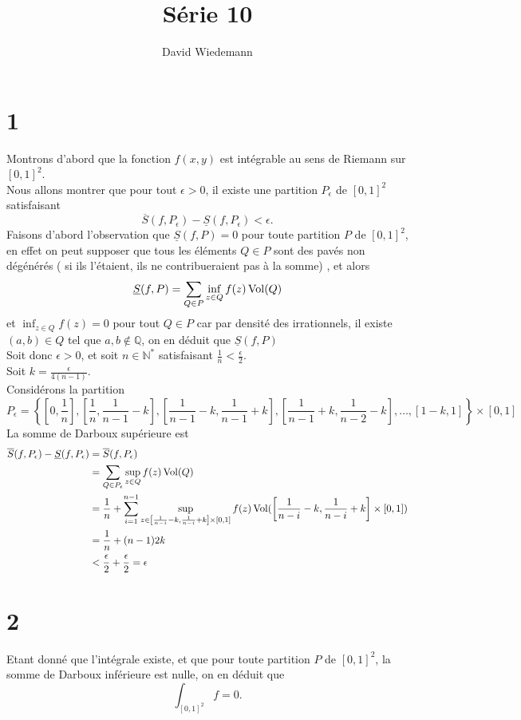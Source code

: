 \documentclass[11pt, a4paper]{article}
\begin{document}
\title{Série 10}
\author{David Wiedemann}
\maketitle
\section*{1}
Montrons d'abord que la fonction $f( x,y) $ est intégrable au sens de Riemann sur $[0,1 ]^{2}$.\\
Nous allons montrer que pour tout $\epsilon>0$, il existe une partition $P_\epsilon$ de $[0,1]^{2}$ satisfaisant
\[ 
	\overline{S}( f,P_\epsilon) -\underline { S} ( f,P_\epsilon) < \epsilon.
\]
Faisons d'abord l'observation que $\underline { S} ( f,P) =0$ pour toute partition $P$ de $ [ 0,1] ^{2}$, en effet on peut supposer que tous les éléments $Q \in P$ sont des pavés non dégénérés ( si ils l'étaient, ils ne contribueraient pas à la somme) 	, et alors
\[ 
	\underline { S} ( f,P) = \sum_{Q \in P} \inf_{z \in Q} f( z) \operatorname*{Vol}( Q) 
\]
et $\inf_{z \in Q} f( z) = 0 $ pour tout $Q \in P$ car par densité des irrationnels, il existe $ ( a,b)  \in Q$ tel que $a,b \notin \mathbb{Q}$, on en déduit que $\underline { S} ( f,P)$\\
\hr
Soit donc $\epsilon>0$, et soit $n \in \mathbb{N}^{*}$ satisfaisant $ \frac{1}{n}< \frac{\epsilon}{2}$.\\
Soit $k = \frac{\epsilon}{4 ( n-1) } $.\\
Considérons la partition 
\[ 
P_\epsilon = \left\{ [ 0, \frac{1}{n}], [ \frac{1}{n}, \frac{1}{n-1}-k] , [ \frac{1}{n-1}-k, \frac{1}{n-1}+k] , [ \frac{1}{n-1}+k , \frac{1}{n-2}-k] , \ldots ,[ 1-k, 1] 	\right\} \times [ 0,1] 
\]
La somme de Darboux supérieure est
\begin{align*}
	\overline{S}( f, P_\epsilon) - \underline{S}( f, P_\epsilon) &= \overline{S}( f, P_\epsilon)\\
								     &= \sum_{Q \in P_\epsilon} \sup_{z \in Q} f( z)  \operatorname*{Vol}  ( Q) \\
				     &= \frac{1}{n} + \sum_{i=1}^{ n-1} \sup _{ z \in \left[ \frac{1}{n-i}-k, \frac{1}{n-i}+k\right] \times [ 0,1] } f( z) \operatorname*{Vol} ( \left[ \frac{1}{n-i}-k, \frac{1}{n-i}+k\right] \times [ 0,1] ) \\
				     &= \frac{1}{n} + ( n-1) 2k\\
				     & < \frac{\epsilon}{2} + \frac{\epsilon}{2}  = \epsilon
\end{align*}
\section*{2}
Etant donné que l'intégrale existe, et que pour toute partition $P$ de $[0,1]^{2}$, la somme de Darboux inférieure est nulle, on en déduit que 
\[ 
	\int_{[0,1]^{2}} f = 0.
\]
\end{document}
